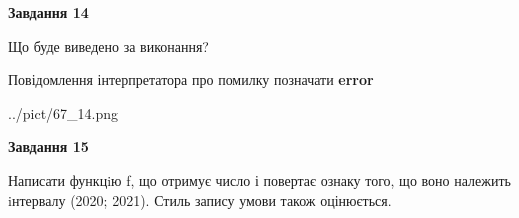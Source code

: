 \documentclass[11pt, ukrainian]{article}
\begin{document}
{\begin {large}
{\begin {center}\textbf{Завдання 14}\end {center}}\par
Що буде виведено за виконання? \par
Повідомлення інтерпретатора про помилку позначати \textbf{error}

\begin{center}
	{../pict/67_14.png}
\end{center}
\newpage

{\begin {center}\textbf{Завдання 15}\end {center}}\par

Написати функцiю f, що отримує число і повертає ознаку того, що воно належить iнтервалу (2020; 2021). Стиль запису умови також оцінюється.\par
\newpage

\end {large}}
\end{document}
